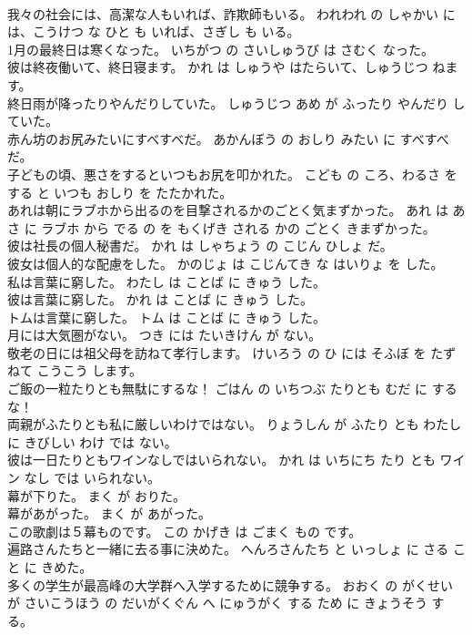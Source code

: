 \documentclass[8pt]{extreport}
\begin{document}
\begin{CJK}{UTF8}{min}
\\	我々の社会には、高潔な人もいれば、詐欺師もいる。	われわれ の しゃかい には、こうけつ な ひと も いれば、さぎし も いる。	
\\	1月の最終日は寒くなった。	いちがつ の さいしゅうび は さむく なった。	
\\	彼は終夜働いて、終日寝ます。	かれ は しゅうや はたらいて、しゅうじつ ねます。	
\\	終日雨が降ったりやんだりしていた。	しゅうじつ あめ が ふったり やんだり していた。	
\\	赤ん坊のお尻みたいにすべすべだ。	あかんぼう の おしり みたい に すべすべ だ。	
\\	子どもの頃、悪さをするといつもお尻を叩かれた。	こども の ころ、わるさ を する と いつも おしり を たたかれた。	
\\	あれは朝にラブホから出るのを目撃されるかのごとく気まずかった。	あれ は あさ に ラブホ から でる の を もくげき される かの ごとく きまずかった。	
\\	彼は社長の個人秘書だ。	かれ は しゃちょう の こじん ひしょ だ。	
\\	彼女は個人的な配慮をした。	かのじょ は こじんてき な はいりょ を した。	
\\	私は言葉に窮した。	わたし は ことば に きゅう した。	
\\	彼は言葉に窮した。	かれ は ことば に きゅう した。	
\\	トムは言葉に窮した。	トム は ことば に きゅう した。	
\\	月には大気圏がない。	つき には たいきけん が ない。	
\\	敬老の日には祖父母を訪ねて孝行します。	けいろう の ひ には そふぼ を たずねて こうこう します。	
\\	ご飯の一粒たりとも無駄にするな！	ごはん の いちつぶ たりとも むだ に する な！	
\\	両親がふたりとも私に厳しいわけではない。	りょうしん が ふたり とも わたし に きびしい わけ では ない。	
\\	彼は一日たりともワインなしではいられない。	かれ は いちにち たり とも ワイン なし では いられない。	
\\	幕が下りた。	まく が おりた。	
\\	幕があがった。	まく が あがった。	
\\	この歌劇は５幕ものです。	この かげき は ごまく もの です。	
\\	遍路さんたちと一緒に去る事に決めた。	へんろさんたち と いっしょ に さる こと に きめた。	
\\	多くの学生が最高峰の大学群へ入学するために競争する。	おおく の がくせい が さいこうほう の だいがくぐん へ にゅうがく する ため に きょうそう する。	

\end{CJK}
\end{document}
